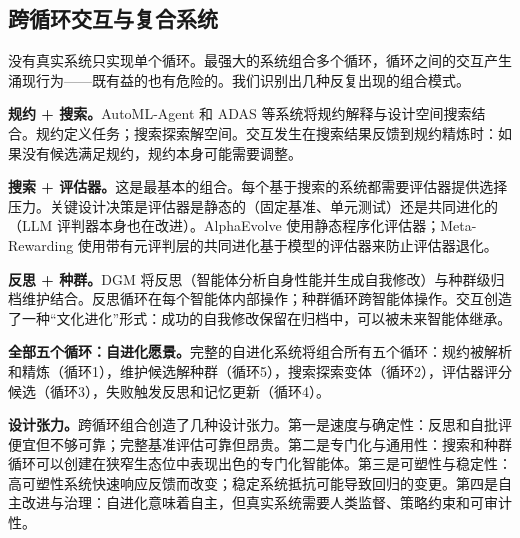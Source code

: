 \subsection{跨循环交互与复合系统}\label{sec:ch2-crossloop}

没有真实系统只实现单个循环。最强大的系统组合多个循环，循环之间的交互产生涌现行为——既有益的也有危险的。我们识别出几种反复出现的组合模式。

\textbf{规约 + 搜索。}AutoML-Agent 和 ADAS 等系统将规约解释与设计空间搜索结合。规约定义任务；搜索探索解空间。交互发生在搜索结果反馈到规约精炼时：如果没有候选满足规约，规约本身可能需要调整。

\textbf{搜索 + 评估器。}这是最基本的组合。每个基于搜索的系统都需要评估器提供选择压力。关键设计决策是评估器是静态的（固定基准、单元测试）还是共同进化的（LLM 评判器本身也在改进）。AlphaEvolve 使用静态程序化评估器；Meta-Rewarding 使用带有元评判层的共同进化基于模型的评估器来防止评估器退化。

\textbf{反思 + 种群。}DGM 将反思（智能体分析自身性能并生成自我修改）与种群级归档维护结合。反思循环在每个智能体内部操作；种群循环跨智能体操作。交互创造了一种``文化进化''形式：成功的自我修改保留在归档中，可以被未来智能体继承。

\textbf{全部五个循环：自进化愿景。}完整的自进化系统将组合所有五个循环：规约被解析和精炼（循环1），维护候选解种群（循环5），搜索探索变体（循环2），评估器评分候选（循环3），失败触发反思和记忆更新（循环4）。

\textbf{设计张力。}跨循环组合创造了几种设计张力。第一是速度与确定性：反思和自批评便宜但不够可靠；完整基准评估可靠但昂贵。第二是专门化与通用性：搜索和种群循环可以创建在狭窄生态位中表现出色的专门化智能体。第三是可塑性与稳定性：高可塑性系统快速响应反馈而改变；稳定系统抵抗可能导致回归的变更。第四是自主改进与治理：自进化意味着自主，但真实系统需要人类监督、策略约束和可审计性。

